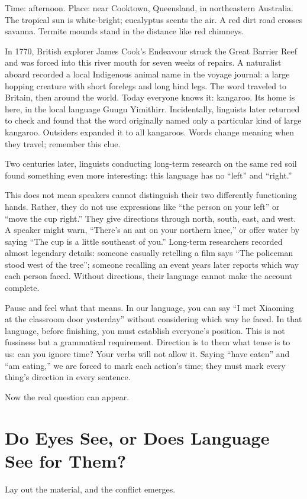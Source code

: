 Time: afternoon. Place: near Cooktown, Queensland, in northeastern Australia. The tropical sun is white-bright; eucalyptus scents the air. A red dirt road crosses savanna. Termite mounds stand in the distance like red chimneys.

In 1770, British explorer James Cook's Endeavour struck the Great Barrier Reef and was forced into this river mouth for seven weeks of repairs. A naturalist aboard recorded a local Indigenous animal name in the voyage journal: a large hopping creature with short forelegs and long hind legs. The word traveled to Britain, then around the world. Today everyone knows it: kangaroo. Its home is here, in the local language Guugu Yimithirr. Incidentally, linguists later returned to check and found that the word originally named only a particular kind of large kangaroo. Outsiders expanded it to all kangaroos. Words change meaning when they travel; remember this clue.

Two centuries later, linguists conducting long-term research on the same red soil found something even more interesting: this language has no ``left'' and ``right.''

This does not mean speakers cannot distinguish their two differently functioning hands. Rather, they do not use expressions like ``the person on your left'' or ``move the cup right.'' They give directions through north, south, east, and west. A speaker might warn, ``There's an ant on your northern knee,'' or offer water by saying ``The cup is a little southeast of you.'' Long-term researchers recorded almost legendary details: someone casually retelling a film says ``The policeman stood west of the tree''; someone recalling an event years later reports which way each person faced. Without directions, their language cannot make the account complete.

Pause and feel what that means. In our language, you can say ``I met Xiaoming at the classroom door yesterday'' without considering which way he faced. In that language, before finishing, you must establish everyone's position. This is not fussiness but a grammatical requirement. Direction is to them what tense is to us: can you ignore time? Your verbs will not allow it. Saying ``have eaten'' and ``am eating,'' we are forced to mark each action's time; they must mark every thing's direction in every sentence.

Now the real question can appear.

\section{Do Eyes See, or Does Language See for Them?}
Lay out the material, and the conflict emerges.


